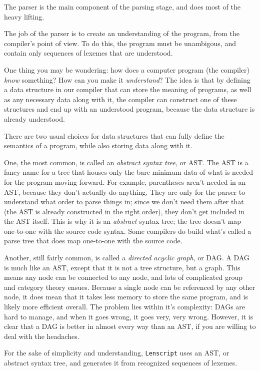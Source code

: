 \documentclass[12pt]{report}
\newcommand{\langname}{Lenscript}
\newcommand{\lang}{\texttt{\langname} }
\begin{document}
The parser is the main component of the parsing stage, and does most of the heavy lifting.

The job of the parser is to create an understanding of the program, from the compiler's point of view. To do this, the program must be unambigous, and contain only sequences of lexemes that are understood.

One thing you may be wondering: how does a computer program (the compiler) \emph{know} something? How can you make it \emph{understand}? The idea is that by defining a data structure in our compiler that can store the meaning of programs, as well as any necessary data along with it, the compiler can construct one of these structures and end up with an understood program, because the data structure is already understood.

There are two usual choices for data structures that can fully define the semantics of a program, while also storing data along with it.

One, the most common, is called an \emph{abstract syntax tree}, or AST. The AST is a fancy name for a tree that houses only the bare minimum data of what is needed for the program moving forward. For example, parentheses aren't needed in an AST, because they don't actually do anything. They are only for the parser to understand what order to parse things in; since we don't need them after that (the AST is already constructed in the right order), they don't get included in the AST itself. This is why it is an \emph{abstract} syntax tree; the tree doesn't map one-to-one with the source code syntax. Some compilers do build what's called a parse tree that does map one-to-one with the source code.

Another, still fairly common, is called a \emph{directed acyclic graph}, or DAG. A DAG is much like an AST, except that it is not a tree structure, but a graph. This means any node can be connected to any node, and lots of complicated group and category theory ensues. Because a single node can be referenced by any other node, it does mean that it takes less memory to store the same program, and is likely more efficient overall. The problem lies within it's complexity: DAGs are hard to manage, and when it goes wrong, it goes very, very wrong. However, it is clear that a DAG is better in almost every way than an AST, if you are willing to deal with the headaches.

For the sake of simplicity and understanding, \lang uses an AST, or abstract syntax tree, and generates it from recognized sequences of lexemes.
\end{document}

